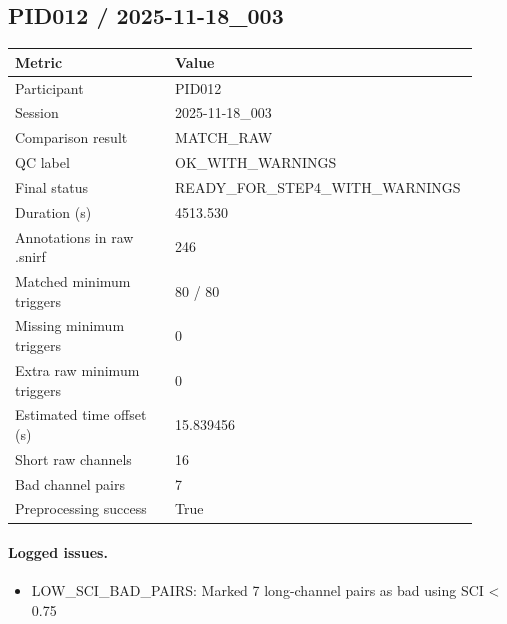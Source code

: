 \subsection*{PID012 / 2025-11-18\_003}
\begin{tabular}{p{0.34\linewidth}p{0.58\linewidth}}
\toprule
Metric & Value\\
\midrule
Participant & PID012\\
Session & 2025-11-18\_003\\
Comparison result & MATCH\_RAW\\
QC label & OK\_WITH\_WARNINGS\\
Final status & READY\_FOR\_STEP4\_WITH\_WARNINGS\\
Duration (s) & 4513.530\\
Annotations in raw .snirf & 246\\
Matched minimum triggers & 80 / 80\\
Missing minimum triggers & 0\\
Extra raw minimum triggers & 0\\
Estimated time offset (s) & 15.839456\\
Short raw channels & 16\\
Bad channel pairs & 7\\
Preprocessing success & True\\
\bottomrule
\end{tabular}
\paragraph{Logged issues.}
\begin{itemize}
\item [WARNING] LOW\_SCI\_BAD\_PAIRS: Marked 7 long-channel pairs as bad using SCI < 0.75
\end{itemize}
